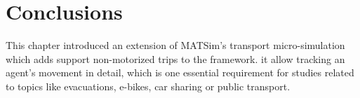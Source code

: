 %
%
%
%

\section{Conclusions}
This chapter introduced an extension of MATSim's transport micro-simulation which adds support non-motorized trips to the framework. it allow tracking an agent's movement in detail, which is one essential requirement for studies related to topics like evacuations, e-bikes, car sharing or public transport.

